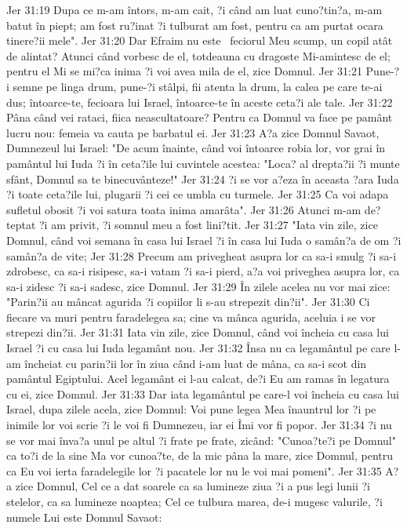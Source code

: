 Jer 31:19  Dupa ce m-am întors, m-am cait, ?i când am luat cuno?tin?a, m-am batut în piept; am fost ru?inat ?i tulburat am fost, pentru ca am purtat ocara tinere?ii mele".
Jer 31:20  Dar Efraim nu este  feciorul Meu scump, un copil atât de alintat? Atunci când vorbesc de el, totdeauna cu dragoste Mi-amintesc de el; pentru el Mi se mi?ca inima ?i voi avea mila de el, zice Domnul.
Jer 31:21  Pune-?i semne pe linga drum, pune-?i stâlpi, fii atenta la drum, la calea pe care te-ai dus; întoarce-te, fecioara lui Israel, întoarce-te în aceste ceta?i ale tale.
Jer 31:22  Pâna când vei rataci, fiica neascultatoare? Pentru ca Domnul va face pe pamânt lucru nou: femeia va cauta pe barbatul ei.
Jer 31:23  A?a zice Domnul Savaot, Dumnezeul lui Israel: "De acum înainte, când voi întoarce robia lor, vor grai în pamântul lui Iuda ?i în ceta?ile lui cuvintele acestea: "Loca? al drepta?ii ?i munte sfânt, Domnul sa te binecuvânteze!"
Jer 31:24  ?i se vor a?eza în aceasta ?ara Iuda ?i toate ceta?ile lui, plugarii ?i cei ce umbla cu turmele.
Jer 31:25  Ca voi adapa sufletul obosit ?i voi satura toata inima amarâta".
Jer 31:26  Atunci m-am de?teptat ?i am privit, ?i somnul meu a fost lini?tit.
Jer 31:27  "Iata vin zile, zice Domnul, când voi semana în casa lui Israel ?i în casa lui Iuda o samân?a de om ?i samân?a de vite;
Jer 31:28  Precum am privegheat asupra lor ca sa-i smulg ?i sa-i zdrobesc, ca sa-i risipesc, sa-i vatam ?i sa-i pierd, a?a voi priveghea asupra lor, ca sa-i zidesc ?i sa-i sadesc, zice Domnul.
Jer 31:29  În zilele acelea nu vor mai zice: "Parin?ii au mâncat agurida ?i copiilor li s-au strepezit din?ii".
Jer 31:30  Ci fiecare va muri pentru faradelegea sa; cine va mânca agurida, aceluia i se vor strepezi din?ii.
Jer 31:31  Iata vin zile, zice Domnul, când voi încheia cu casa lui Israel ?i cu casa lui Iuda legamânt nou.
Jer 31:32  Însa nu ca legamântul pe care l-am încheiat cu parin?ii lor în ziua când i-am luat de mâna, ca sa-i scot din pamântul Egiptului. Acel legamânt ei l-au calcat, de?i Eu am ramas în legatura cu ei, zice Domnul.
Jer 31:33  Dar iata legamântul pe care-l voi încheia cu casa lui Israel, dupa zilele acela, zice Domnul: Voi pune legea Mea înauntrul lor ?i pe inimile lor voi scrie ?i le voi fi Dumnezeu, iar ei Îmi vor fi popor.
Jer 31:34  ?i nu se vor mai înva?a unul pe altul ?i frate pe frate, zicând: "Cunoa?te?i pe Domnul" ca to?i de la sine Ma vor cunoa?te, de la mic pâna la mare, zice Domnul, pentru ca Eu voi ierta faradelegile lor ?i pacatele lor nu le voi mai pomeni".
Jer 31:35  A?a zice Domnul, Cel ce a dat soarele ca sa lumineze ziua ?i a pus legi lunii ?i stelelor, ca sa lumineze noaptea; Cel ce tulbura marea, de-i mugesc valurile, ?i numele Lui este Domnul Savaot:
